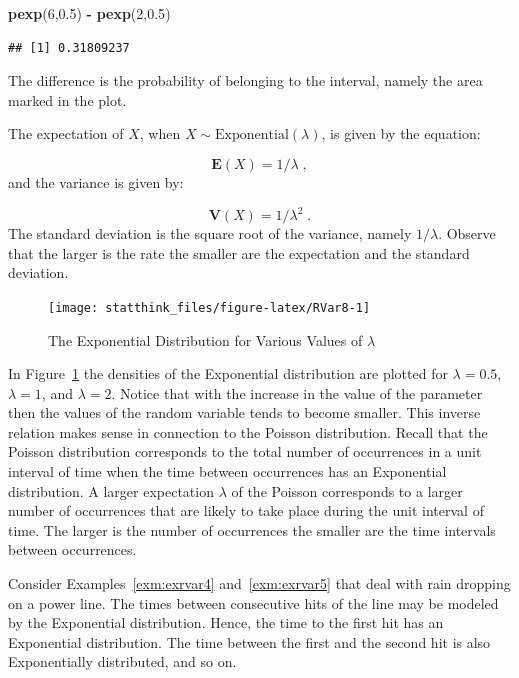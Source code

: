 \documentclass[]{krantz}
\makeatletter
\newenvironment{Shaded}{\begin{snugshade}}{\end{snugshade}}
\newcommand{\DecValTok}[1]{\textcolor[rgb]{0.00,0.00,0.81}{#1}}
\newcommand{\FloatTok}[1]{\textcolor[rgb]{0.00,0.00,0.81}{#1}}
\newcommand{\KeywordTok}[1]{\textcolor[rgb]{0.13,0.29,0.53}{\textbf{#1}}}
\newcommand{\NormalTok}[1]{#1}
\newcommand{\OperatorTok}[1]{\textcolor[rgb]{0.81,0.36,0.00}{\textbf{#1}}}
\newcommand{\StringTok}[1]{\textcolor[rgb]{0.31,0.60,0.02}{#1}}
\newcommand{\Expec}{\mathbf{E}}
\newcommand{\Var}{\mathbf{V}}
\newenvironment{kframe}{%
\medskip{}
\setlength{\fboxsep}{.8em}
 \def\at@end@of@kframe{}%
 \ifinner\ifhmode%
  \def\at@end@of@kframe{\end{minipage}}%
  \begin{minipage}{\columnwidth}%
 \fi\fi%
 \def\FrameCommand##1{\hskip\@totalleftmargin \hskip-\fboxsep
 \colorbox{shadecolor}{##1}\hskip-\fboxsep
     \hskip-\linewidth \hskip-\@totalleftmargin \hskip\columnwidth}%
 \MakeFramed {\advance\hsize-\width
   \@totalleftmargin\z@ \linewidth\hsize
   \@setminipage}}%
 {\par\unskip\endMakeFramed%
 \at@end@of@kframe}
\renewenvironment{Shaded}{\begin{kframe}}{\end{kframe}}
\theoremstyle{definition}
\theoremstyle{definition}
\theoremstyle{definition}
\theoremstyle{remark}
\let\BeginKnitrBlock\begin \let\EndKnitrBlock\end
\makeatother
\begin{document}
\begin{Shaded}
\begin{Highlighting}[]
\KeywordTok{pexp}\NormalTok{(}\DecValTok{6}\NormalTok{,}\FloatTok{0.5}\NormalTok{) }\OperatorTok{-}\StringTok{ }\KeywordTok{pexp}\NormalTok{(}\DecValTok{2}\NormalTok{,}\FloatTok{0.5}\NormalTok{)}
\end{Highlighting}
\end{Shaded}

\begin{verbatim}
## [1] 0.31809237
\end{verbatim}

The difference is the probability of belonging to the interval, namely
the area marked in the plot.

The expectation of \(X\), when \(X \sim \mathrm{Exponential}(\lambda)\), is
given by the equation:

\[\Expec(X) = 1/\lambda\;,\] and the variance is
given by:

\[\Var(X) =1/\lambda^2\;.\] The standard deviation is the
square root of the variance, namely \(1/\lambda\). Observe that the larger
is the rate the smaller are the expectation and the standard deviation.

\begin{figure}

{\centering \texttt{[image: statthink\_files/figure-latex/RVar8-1]} 

}

\caption{The Exponential Distribution for Various Values of $\lambda$}\label{fig:RVar8}
\end{figure}

In Figure~\ref{fig:RVar8} the densities of the Exponential
distribution are plotted for \(\lambda = 0.5\), \(\lambda = 1\), and
\(\lambda = 2\). Notice that with the increase in the value of the
parameter then the values of the random variable tends to become
smaller. This inverse relation makes sense in connection to the Poisson
distribution. Recall that the Poisson distribution corresponds to the
total number of occurrences in a unit interval of time when the time
between occurrences has an Exponential distribution. A larger
expectation \(\lambda\) of the Poisson corresponds to a larger number of
occurrences that are likely to take place during the unit interval of
time. The larger is the number of occurrences the smaller are the time
intervals between occurrences.

\BeginKnitrBlock{example}
\protect\hypertarget{exm:exrvar7}{}{\label{exm:exrvar7} }Consider Examples~\ref{exm:exrvar4}
and~\ref{exm:exrvar5} that deal with rain dropping on a power line.
The times between consecutive hits of the line may be modeled by the
Exponential distribution. Hence, the time to the first hit has an
Exponential distribution. The time between the first and the second hit
is also Exponentially distributed, and so on.
\EndKnitrBlock{example}
\end{document}
